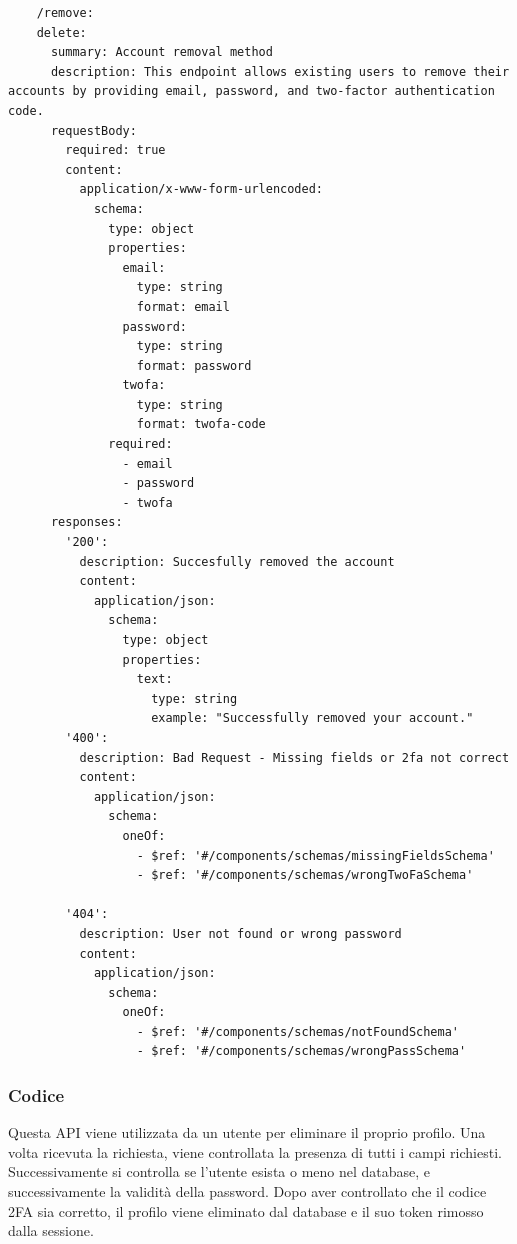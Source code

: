 \documentclass{report}
\begin{document}
\begin{verbatim}
	/remove:
    delete:
      summary: Account removal method
      description: This endpoint allows existing users to remove their accounts by providing email, password, and two-factor authentication code.
      requestBody:
        required: true
        content:
          application/x-www-form-urlencoded:
            schema:
              type: object
              properties:
                email:
                  type: string
                  format: email
                password:
                  type: string
                  format: password
                twofa:
                  type: string
                  format: twofa-code
              required:
                - email
                - password
                - twofa
      responses:
        '200':
          description: Succesfully removed the account
          content:
            application/json:
              schema:
                type: object
                properties:
                  text:
                    type: string
                    example: "Successfully removed your account."
        '400':
          description: Bad Request - Missing fields or 2fa not correct
          content:
            application/json:
              schema:
                oneOf:
                  - $ref: '#/components/schemas/missingFieldsSchema'
                  - $ref: '#/components/schemas/wrongTwoFaSchema'
      
        '404':
          description: User not found or wrong password
          content:
            application/json:
              schema:
                oneOf:
                  - $ref: '#/components/schemas/notFoundSchema'
                  - $ref: '#/components/schemas/wrongPassSchema'

\end{verbatim}

\subsubsection*{Codice}
Questa API viene utilizzata da un utente per eliminare il proprio profilo.
Una volta ricevuta la richiesta, viene controllata la presenza di tutti i campi richiesti.
Successivamente si controlla se l'utente esista o meno nel database, e successivamente la validità della password.
Dopo aver controllato che il codice 2FA sia corretto, il profilo viene eliminato dal database e il suo token rimosso dalla sessione.
\end{document}
